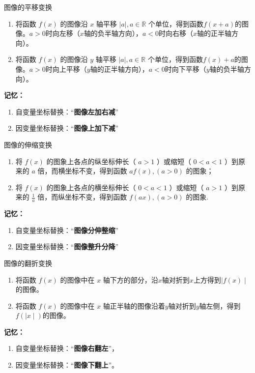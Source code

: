 \vspace{3mm}
\begin{conclusion}{图像的平移变换}{}
\begin{enumerate}
\item 将函数 $f(x)$ 的图像沿 $x$ 轴平移 $\mid a \mid, a \in \mathbb{R}$ 个单位，得到函数$f(x+a)$的图像。$a>0$时向左移（$x$轴的负半轴方向），$a<0$时向右移（$x$轴的正半轴方向）。
\item 将函数 $f(x)$ 的图像沿 $y$ 轴平移 $\mid a \mid, a \in \mathbb{R}$ 个单位，得到函数$f(x) + a$的图像。$a>0$时向上平移（$y$轴的正半轴方向），$a<0$时向下平移（$y$轴的负半轴方向）。
\end{enumerate}
\textbf{记忆：} 
\begin{enumerate}
\item \textcolor{main}{自变量}坐标替换：“\textbf{图像左加右减}”
\item \textcolor{main}{因变量}坐标替换：“\textbf{图像上加下减}”
\end{enumerate}
\end{conclusion}

\vspace{3mm}
\begin{conclusion}{图像的伸缩变换}
\begin{enumerate}
\item 将 $f(x)$ 的图象上各点的纵坐标伸长（ $a>1$ ）或缩短（ $0<a<1$ ）到原来的 $a$ 倍，而横坐标不变，得到函数 $af(x), (a>0)$ 的图象；
\item 将 $f(x)$ 的图象上各点的横坐标伸长（ $0<a<1$ ）或缩短（ $a>1$ ）到原来的 $\displaystyle \frac{1}{a}$ 倍，而纵坐标不变，得到函数 $f(ax), (a>0)$ 的图象.
\end{enumerate}
\textbf{记忆：} 
\begin{enumerate}
\item \textcolor{main}{自变量}坐标替换：“\textbf{图像分伸整缩}”
\item \textcolor{main}{因变量}坐标替换：“\textbf{图像整升分降}”
\end{enumerate}
\end{conclusion}

\vspace{3mm}
\begin{conclusion}{图像的翻折变换}
\begin{enumerate}
\item 将函数 $f(x)$ 的图像中在 $x$ 轴下方的部分，沿$x$轴对折到$x$上方得到$\mid f(x) \mid$的图像。
\item 将函数 $f(x)$ 的图像中在 $x$ 轴正半轴的图像沿着$y$轴对折到$y$轴左侧，得到$f(\mid x \mid)$的图像。
\end{enumerate}
\textbf{记忆：} 
\begin{enumerate}
\item \textcolor{main}{自变量}坐标替换：“\textbf{图像右翻左}”，
\item \textcolor{main}{因变量}坐标替换：“\textbf{图像下翻上}”。
\end{enumerate} 
\end{conclusion}

